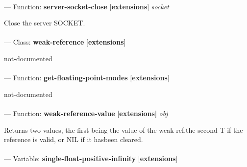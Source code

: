 \paragraph{}
\label{EXTENSIONS:SERVER-SOCKET-CLOSE}
--- Function: \textbf{server-socket-close} [\textbf{extensions}] \textit{socket}

\begin{adjustwidth}{5em}{5em}
Close the server SOCKET.
\end{adjustwidth}

\paragraph{}
\label{EXTENSIONS:WEAK-REFERENCE}
--- Class: \textbf{weak-reference} [\textbf{extensions}] \textit{}

\begin{adjustwidth}{5em}{5em}
not-documented
\end{adjustwidth}

\paragraph{}
\label{EXTENSIONS:GET-FLOATING-POINT-MODES}
--- Function: \textbf{get-floating-point-modes} [\textbf{extensions}] \textit{}

\begin{adjustwidth}{5em}{5em}
not-documented
\end{adjustwidth}

\paragraph{}
\label{EXTENSIONS:WEAK-REFERENCE-VALUE}
--- Function: \textbf{weak-reference-value} [\textbf{extensions}] \textit{obj}

\begin{adjustwidth}{5em}{5em}
Returns two values, the first being the value of the weak ref,the second T if the reference is valid, or NIL if it hasbeen cleared.
\end{adjustwidth}

\paragraph{}
\label{EXTENSIONS:SINGLE-FLOAT-POSITIVE-INFINITY}
--- Variable: \textbf{single-float-positive-infinity} [\textbf{extensions}] \textit{}

